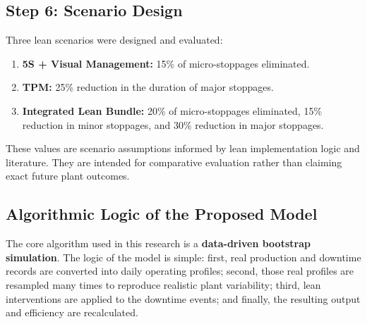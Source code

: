 \documentclass[12pt,a4paper]{article}
\begin{document}
\subsection{Step 6: Scenario Design}
Three lean scenarios were designed and evaluated:
\begin{enumerate}
    \item \textbf{5S + Visual Management:} 15\% of micro-stoppages eliminated.
    \item \textbf{TPM:} 25\% reduction in the duration of major stoppages.
    \item \textbf{Integrated Lean Bundle:} 20\% of micro-stoppages eliminated, 15\% reduction in minor stoppages, and 30\% reduction in major stoppages.
\end{enumerate}

These values are scenario assumptions informed by lean implementation logic and literature. They are intended for comparative evaluation rather than claiming exact future plant outcomes.

\subsection{Algorithmic Logic of the Proposed Model}
The core algorithm used in this research is a \textbf{data-driven bootstrap simulation}. The logic of the model is simple: first, real production and downtime records are converted into daily operating profiles; second, those real profiles are resampled many times to reproduce realistic plant variability; third, lean interventions are applied to the downtime events; and finally, the resulting output and efficiency are recalculated.
\end{document}
